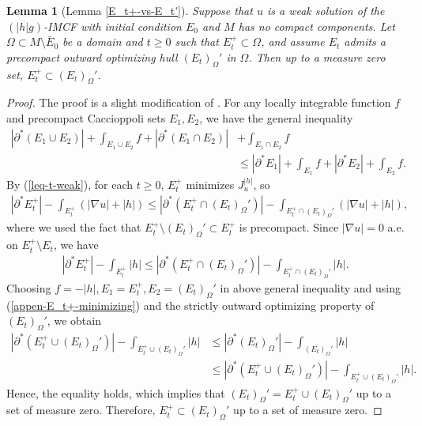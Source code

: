 \documentclass[11pt, letterpaper]{amsart}
\newtheorem{lem}[thm]{Lemma}
\theoremstyle{definition}
\theoremstyle{remark}
\begin{document}
\begin{appendix}
\begin{lem}[Lemma \ref{E_t+-vs-E_t'}]
	Suppose that $u$ is a weak solution of the $(|h|g)$-IMCF with initial condition $E_0$ and $M$ has no compact components. Let $\Omega \subset M \setminus \bar{E}_0$ be a domain and $t \geq 0$ such that $E_t ^{+} \subset \Omega $, and assume $E_t$ admits a precompact outward optimizing hull $(E_{t})_{\Omega }'$ in $\Omega $. Then up to a measure zero set,
 $E_t ^+ \subset (E_t)_{\Omega }'$.
\end{lem}
\begin{proof}
	The proof is a slight modification of \cite[Proposition 8.3]{HuiskenWolff22}. For any locally integrable function $f$ and precompact Caccioppoli sets $E_1, E_2$, we have the general inequality
	\begin{align*}
		|\partial ^*(E_1\cup E_2)| + \int_{E_1 \cup E_2} f + |\partial ^* (E_1\cap E_2)| & + \int_{E_1\cap E_2} f \\
		&\leq |\partial ^* E_1| + \int_{E_1} f + |\partial ^* E_2| + \int_{E_2} f.
	\end{align*}
	By (\ref{leq-t-weak}), for each $t \geq 0$, $E_t ^+$ minimizes $J^{|h|}_{u}$, so 
	\begin{align*}
		|\partial ^* E_t ^+| - \int_{E_t^+} \left( |\nabla u| + |h| \right) \leq |\partial ^*(E_t^+ \cap (E_t)_{\Omega }')| - \int_{E_t^+ \cap (E_t)_{\Omega }'} \left( |\nabla u| + |h| \right) ,
	\end{align*} 
	where we used the fact that $E_t^+ \setminus (E_t)_{\Omega }' \subset E_t^+$ is precompact. Since $|\nabla u| = 0$ a.e. on $E_t^+ \setminus E_t$, we have
	\begin{align}\label{appen-E_t+-minimizing}
		|\partial ^* E_t^+| - \int_{E_t^+}|h| \leq |\partial ^*(E_t^+ \cap (E_t)_{\Omega }')| - \int_{E_t^+ \cap (E_t)_{\Omega }'} |h|.
	\end{align} 
	Choosing $f= - |h|, E_1 = E_t^+, E_2= (E_t)_{\Omega }'$ in above general inequality and using (\ref{appen-E_t+-minimizing}) and the strictly outward optimizing property of $(E_t)_{\Omega }'$, we obtain
	\begin{align*}
		|\partial ^* ( E_t^+ \cup  (E_t)_{\Omega }')| - \int_{ E_t^+ \cup (E_t)_{\Omega }'}|h| &\leq |\partial ^* (E_t)_{\Omega }'| - \int_{(E_t)_{\Omega }'}|h|\\
		&\leq |\partial ^* ( E_t^+ \cup  (E_t)_{\Omega }')| - \int_{ E_t^+ \cup (E_t)_{\Omega }'}|h| .
	\end{align*} 
	Hence, the equality holds, which implies that $(E_t)_{\Omega }' = E_t^+ \cup  (E_t)_{\Omega }'$ up to a set of measure zero. Therefore, $E_t^+ \subset (E_t)_{\Omega }'$ up to a set of measure zero. 
	

\end{proof}
\end{appendix}
\end{document}
